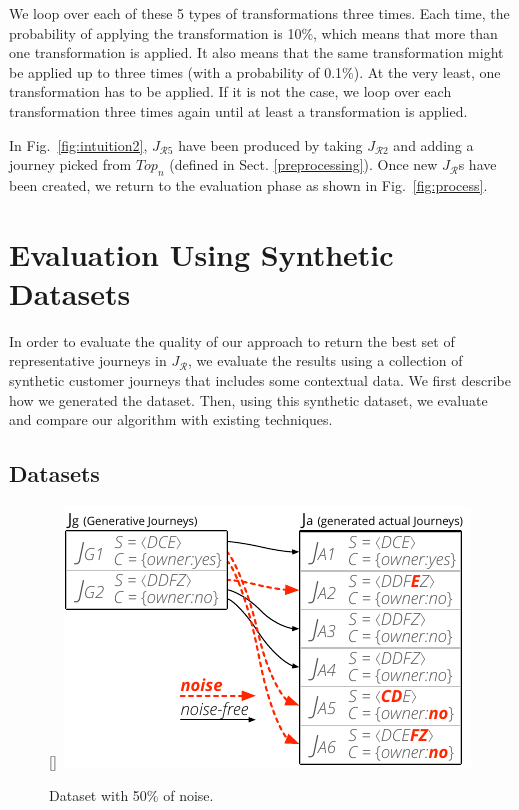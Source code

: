 \documentclass[runningheads]{llncs}
\begin{document}
{{We loop over each of these 5 types of transformations three times. Each time, the probability of applying the transformation is 10\%, which means that more than one transformation is applied. It also means that the same transformation might be applied up to three times (with a probability of 0.1\%). At the very least, one transformation has to be applied. If it is not the case, we loop over each transformation three times again until at least a transformation is applied.

In Fig.~\ref{fig:intuition2}, $J_{\mathcal{R}5}$ have been produced by taking $J_{\mathcal{R}2}$ and adding a journey picked from $Top_n$ (defined in Sect. \ref{preprocessing}). Once new $J_{\mathcal{R}}$s have been created, we return to the evaluation phase as shown in Fig.~\ref{fig:process}. 

\section{Evaluation Using Synthetic Datasets}
In order to evaluate the quality of our approach to return the best set of representative journeys in $J_{\mathcal{R}}$, we evaluate the results using a collection of synthetic customer journeys that includes some contextual data. We first describe how we generated the dataset. Then, using this synthetic dataset, we evaluate and compare our algorithm with existing techniques. 

\subsection{Datasets}


\begin{figure}
  \begin{center}
    \raisebox{0pt}[\dimexpr{}\baselineskip\relax]{\
\includegraphics[width=0.42\columnwidth]{05_schema/dataset.pdf}
    }
  \end{center}
  \vspace{-5pt}
  \caption{Dataset with 50\% of noise.}
  \label{fig:dataset}
\end{figure} 


}}
\end{document}
